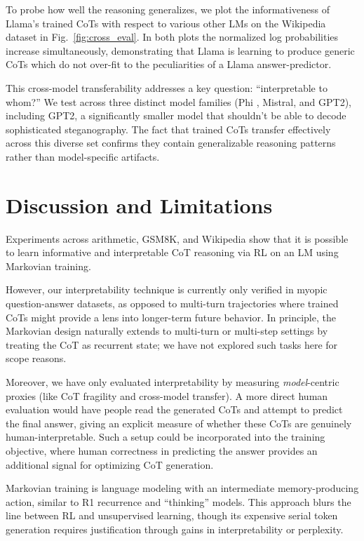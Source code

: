 \documentclass{article}
\begin{document}
To probe how well the reasoning generalizes, we plot the informativeness of Llama's trained CoTs with respect to various other LMs on the Wikipedia dataset in Fig.~\ref{fig:cross_eval}. In both plots the normalized log probabilities increase simultaneously, demonstrating that Llama is learning to produce generic CoTs which do not over-fit to the peculiarities of a Llama answer-predictor. 

This cross-model transferability addresses a key question: ``interpretable to whom?'' We test across three distinct model families (Phi \citep{abdin2024phi3technicalreporthighly}, Mistral, and GPT2), including GPT2, a significantly smaller model that shouldn't be able to decode sophisticated steganography. The fact that trained CoTs transfer effectively across this diverse set confirms they contain generalizable reasoning patterns rather than model-specific artifacts.

\section{Discussion and Limitations}
\label{sec:disc}

Experiments across arithmetic, GSM8K, and Wikipedia show that it is possible to learn informative and interpretable CoT reasoning via RL on an LM using Markovian training.

However, our interpretability technique is currently only verified in myopic question-answer datasets, as opposed to multi-turn trajectories where trained CoTs might provide a lens into longer-term future behavior. In principle, the Markovian design naturally extends to multi-turn or multi-step settings by treating the CoT as recurrent state; we have not explored such tasks here for scope reasons.

Moreover, we have only evaluated interpretability by measuring \emph{model}-centric proxies (like CoT fragility and cross-model transfer). A more direct human evaluation would have people read the generated CoTs and attempt to predict the final answer, giving an explicit measure of whether these CoTs are genuinely human-interpretable. Such a setup could be incorporated into the training objective, where human correctness in predicting the answer provides an additional signal for optimizing CoT generation.

Markovian training is language modeling with an intermediate memory-producing action, similar to R1 recurrence and ``thinking'' models. This approach blurs the line between RL and unsupervised learning, though its expensive serial token generation requires justification through gains in interpretability or perplexity.
\end{document}
